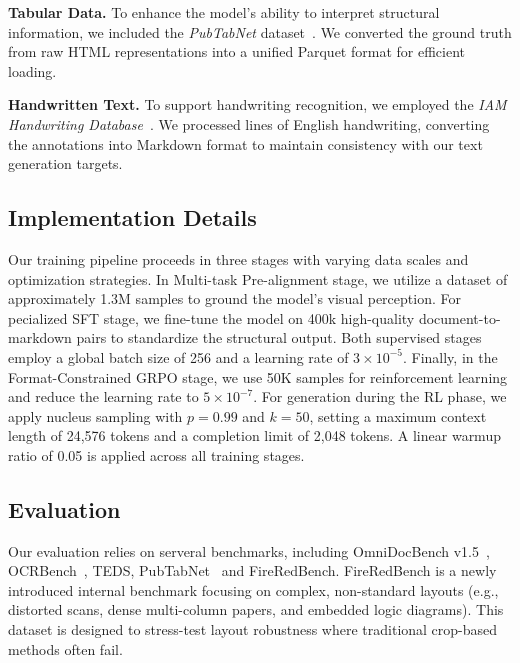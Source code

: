\textbf{Tabular Data.} 
To enhance the model's ability to interpret structural information, we included the \textit{PubTabNet} dataset~\cite{zhong2019image}. We converted the ground truth from raw HTML representations into a unified Parquet format for efficient loading. 

\textbf{Handwritten Text.} 
To support handwriting recognition, we employed the \textit{IAM Handwriting Database}~\cite{IAM-line}. We processed lines of English handwriting, converting the annotations into Markdown format to maintain consistency with our text generation targets.




\subsection{Implementation Details}
\label{subsec:implementation}

Our training pipeline proceeds in three stages with varying data scales and optimization strategies. 
In Multi-task Pre-alignment stage, we utilize a dataset of approximately 1.3M samples to ground the model's visual perception. 
For pecialized SFT stage, we fine-tune the model on 400k high-quality document-to-markdown pairs to standardize the structural output. 
Both supervised stages employ a global batch size of 256 and a learning rate of $3 \times 10^{-5}$. 
Finally, in the Format-Constrained GRPO stage, we use 50K samples for reinforcement learning and reduce the learning rate to $5 \times 10^{-7}$. 
For generation during the RL phase, we apply nucleus sampling with $p=0.99$ and $k=50$, setting a maximum context length of 24,576 tokens and a completion limit of 2,048 tokens. 
A linear warmup ratio of 0.05 is applied across all training stages.


\subsection{Evaluation}


Our evaluation relies on serveral benchmarks, including OmniDocBench v1.5~\cite{ouyang2025omnidocbench}, OCRBench~\cite{liu2024ocrbench}, TEDS, PubTabNet~\cite{zhong2019image} and FireRedBench. FireRedBench is a newly introduced internal benchmark focusing on complex, non-standard layouts (e.g., distorted scans, dense multi-column papers, and embedded logic diagrams). This dataset is designed to stress-test layout robustness where traditional crop-based methods often fail. 



